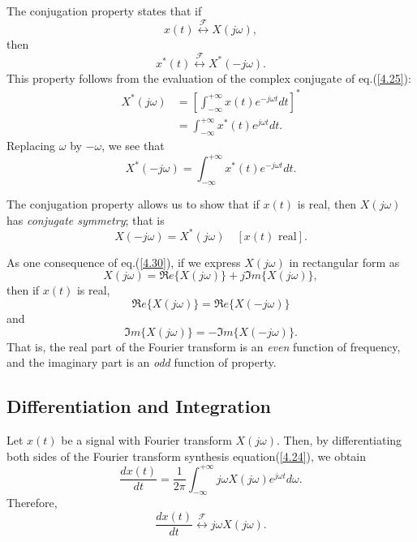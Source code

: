 \documentclass[a4paper,twoside]{book}
\begin{document}
The conjugation property states that if $$x(t)\overset{\mathcal{F}}{\longleftrightarrow}X(j\omega),$$ then
\begin{equation}
    \boxed{x^*(t)\overset{\mathcal{F}}{\longleftrightarrow}X^*(-j\omega).}
    \label{4.28}
\end{equation}
This property follows from the evaluation of the complex conjugate of eq.\;(\ref{4.25}):
\begin{equation*}
    \begin{aligned}X^{*}(j\omega)&=\left[\int_{-\infty}^{+\infty}x(t)e^{-j\omega t}dt\right]^{*}\\&=\int_{-\infty}^{+\infty}x^{*}(t)e^{j\omega t} dt.\end{aligned}
\end{equation*}
Replacing $\omega$ by $-\omega$, we see that
\begin{equation}
    X^*(-j\omega)=\int_{-\infty}^{+\infty}x^*(t)e^{-j\omega t}dt.
    \label{4.29}
\end{equation}

The conjugation property allows us to show that if $x(t)$ is real, then $X(j\omega)$ has \textit{conjugate symmetry}; that is
\begin{equation}
    \boxed{X(-j\omega)=X^*(j\omega)\quad[x(t)\text{ real}].}
    \label{4.30}
\end{equation}

As one consequence of eq.\;(\ref{4.30}), if we express $X(j\omega)$ in rectangular form as $$X(j\omega)=\Re e\{X(j\omega)\}+j\Im m\{X(j\omega)\},$$ then if $x(t)$ is real, $$\Re e\{X(j\omega)\}=\Re e\{X(-j\omega)\}$$ and $$\Im m\{X(j\omega)\}=-\Im m\{X(-j\omega)\}.$$ That is, the real part of the Fourier transform is an \textit{even} function of frequency, and the imaginary part is an \textit{odd} function of property.

\subsection{Differentiation and Integration}
\label{section:4.3.4}

Let $x(t)$ be a signal with Fourier transform $X(j\omega)$. Then, by differentiating both sides of the Fourier transform synthesis equation\;(\ref{4.24}), we obtain $$\frac{dx(t)}{dt}=\frac1{2\pi}\int_{-\infty}^{+\infty}j\omega X(j\omega)e^{j\omega t}d\omega.$$ Therefore,
\begin{equation}
    \boxed{\frac{dx(t)}{dt}\overset{\mathcal{F}}{\longleftrightarrow}j\omega X(j\omega).}
    \label{4.31}
\end{equation}
\end{document}
